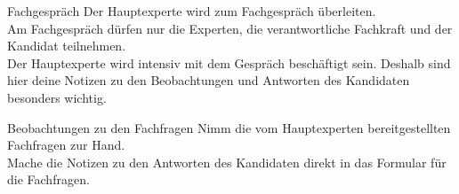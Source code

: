\begin{taskitemwithoutcomment}{Fachgespräch}
  Der Hauptexperte wird zum Fachgespräch überleiten.\\
  Am Fachgespräch dürfen nur die Experten, die verantwortliche Fachkraft und der Kandidat teilnehmen.\\
  Der Hauptexperte wird intensiv mit dem Gespräch beschäftigt sein. Deshalb sind hier deine Notizen zu den Beobachtungen und Antworten des Kandidaten besonders wichtig.
\end{taskitemwithoutcomment}
\begin{taskitemwithoutcomment}{Beobachtungen zu den Fachfragen}
  Nimm die vom Hauptexperten bereitgestellten Fachfragen zur Hand.\\
  Mache die Notizen zu den Antworten des Kandidaten direkt in das Formular für die Fachfragen.
\end{taskitemwithoutcomment}
